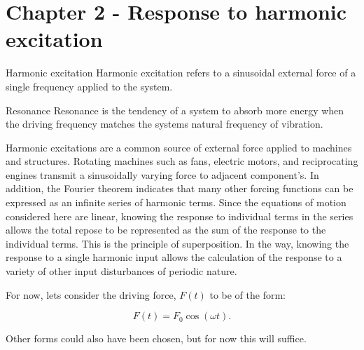 \chapter*{Chapter 2 - Response to harmonic excitation}
  \begin{fmd-definition}{Harmonic excitation}
    Harmonic excitation refers to a sinusoidal external force of a single frequency applied to the system.
  \end{fmd-definition}

  \begin{fmd-definition}{Resonance}
    Resonance is the tendency of a system to absorb more energy when the driving frequency matches the systems natural frequency of vibration.
  \end{fmd-definition}

  Harmonic excitations are a common source of external force applied to machines and structures. Rotating machines such as fans, electric motors, and reciprocating engines transmit a sinusoidally varying force to adjacent component's. In addition, the Fourier theorem indicates that many other forcing functions can be expressed as an infinite series of harmonic terms. Since the equations of motion considered here are linear, knowing the response to individual terms in the series allows the total repose to be represented as the sum of the response to the individual terms. This is the principle of superposition. In the way, knowing the response to a single harmonic input allows the calculation of the response to a variety of other input disturbances of periodic nature.

  For now, lets consider the driving force, $F(t)$ to be of the form:

  \begin{equation}
    F(t) = F_0 \cos(\omega t).
  \end{equation}

  \noindent Other forms could also have been chosen, but for now this will suffice.

  \begin{figure}
    \begin{tikzpicture}
    \end{tikzpicture}
  \end{figure}
  
